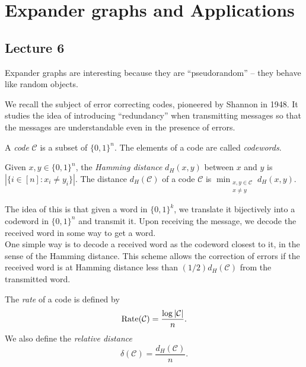 \section{Expander graphs and Applications}

	\subsection{Lecture 6}


		Expander graphs are interesting because they are ``pseudorandom'' -- they behave like random objects.

		We recall the subject of error correcting codes, pioneered by Shannon in 1948. It studies the idea of introducing ``redundancy'' when transmitting messages so that the messages are understandable even in the presence of errors.

		\begin{definition}
			A \emph{code} $\mathcal{C}$ is a subset of $\{0,1\}^n$. The elements of a code are called \emph{codewords}.\\
		\end{definition}
		\begin{definition}
			Given $x,y \in \{0,1\}^n$, the \emph{Hamming distance} $d_H(x,y)$ between $x$ and $y$ is $|\{i \in [n] : x_i \ne y_i\}|$. The distance $d_H(\mathcal{C})$ of a code $\mathcal{C}$ is $\min_{\substack{x,y \in \mathcal{C} \\ x \ne y}} d_H(x,y)$.
		\end{definition}

		The idea of this is that given a word in $\{0,1\}^k$, we translate it bijectively into a codeword in $\{0,1\}^n$ and transmit it. Upon receiving the message, we decode the received word in some way to get a word.\\
		One simple way is to decode a received word as the codeword closest to it, in the sense of the Hamming distance. This scheme allows the correction of errors if the received word is at Hamming distance less than $(1/2)d_H(\mathcal{C})$ from the transmitted word.

		\begin{definition}
			The \emph{rate} of a code is defined by
			\[ \operatorname{Rate}(\mathcal{C}) = \frac{\log |\mathcal{C}|}{n}. \]
			We also define the \emph{relative distance}
			\[ \delta(\mathcal{C}) = \frac{d_H(\mathcal{C})}{n}. \]
		\end{definition}


